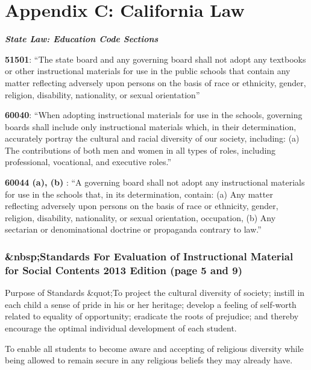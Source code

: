 \chapter{Appendix C: California Law}

\textit{\textbf{State Law: Education Code Sections}}

\textbf{51501}: “The state board and any governing board shall not adopt any textbooks or other instructional materials for use in the public schools that contain any matter reflecting adversely upon persons on the basis of race or ethnicity, gender, religion, disability, nationality, or sexual orientation”

\textbf{60040}: “When adopting instructional materials for use in the schools, governing boards shall include only instructional materials which, in their determination, accurately portray the cultural and racial diversity of our society, including: (a) The contributions of both men and women in all types of roles, including professional, vocational, and executive roles.”

\textbf{60044 (a), (b)} : “A governing board shall not adopt any instructional materials for use in the schools that, in its determination, contain: (a) Any matter reflecting adversely upon persons on the basis of race or ethnicity, gender, religion, disability, nationality, or sexual orientation, occupation, (b) Any sectarian or denominational doctrine or propaganda contrary to law.”

\subsection*{&nbsp;Standards For Evaluation of Instructional Material for Social Contents 2013 Edition (page 5 and 9)}

Purpose of Standards &quot;To project the cultural diversity of society; instill in each child a sense of pride in his or her heritage; develop a feeling of self-worth related to equality of opportunity; eradicate the roots of prejudice; and thereby encourage the optimal individual development of each student.

To enable all students to become aware and accepting of religious diversity while being allowed to remain secure in any religious beliefs they may already have.

